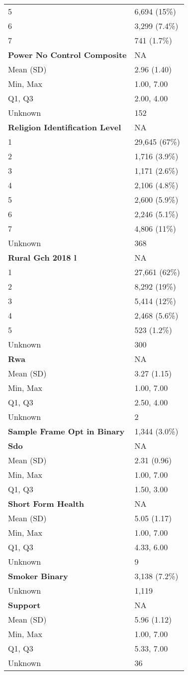 \documentclass[
  single column]{article}
\begin{document}
\begin{longtable}[]{@{}ll@{}}
5 & 6,694 (15\%) \\
6 & 3,299 (7.4\%) \\
7 & 741 (1.7\%) \\
\textbf{Power No Control Composite} & NA \\
Mean (SD) & 2.96 (1.40) \\
Min, Max & 1.00, 7.00 \\
Q1, Q3 & 2.00, 4.00 \\
Unknown & 152 \\
\textbf{Religion Identification Level} & NA \\
1 & 29,645 (67\%) \\
2 & 1,716 (3.9\%) \\
3 & 1,171 (2.6\%) \\
4 & 2,106 (4.8\%) \\
5 & 2,600 (5.9\%) \\
6 & 2,246 (5.1\%) \\
7 & 4,806 (11\%) \\
Unknown & 368 \\
\textbf{Rural Gch 2018 l} & NA \\
1 & 27,661 (62\%) \\
2 & 8,292 (19\%) \\
3 & 5,414 (12\%) \\
4 & 2,468 (5.6\%) \\
5 & 523 (1.2\%) \\
Unknown & 300 \\
\textbf{Rwa} & NA \\
Mean (SD) & 3.27 (1.15) \\
Min, Max & 1.00, 7.00 \\
Q1, Q3 & 2.50, 4.00 \\
Unknown & 2 \\
\textbf{Sample Frame Opt in Binary} & 1,344 (3.0\%) \\
\textbf{Sdo} & NA \\
Mean (SD) & 2.31 (0.96) \\
Min, Max & 1.00, 7.00 \\
Q1, Q3 & 1.50, 3.00 \\
\textbf{Short Form Health} & NA \\
Mean (SD) & 5.05 (1.17) \\
Min, Max & 1.00, 7.00 \\
Q1, Q3 & 4.33, 6.00 \\
Unknown & 9 \\
\textbf{Smoker Binary} & 3,138 (7.2\%) \\
Unknown & 1,119 \\
\textbf{Support} & NA \\
Mean (SD) & 5.96 (1.12) \\
Min, Max & 1.00, 7.00 \\
Q1, Q3 & 5.33, 7.00 \\
Unknown & 36 \\

\end{longtable}
\end{document}
